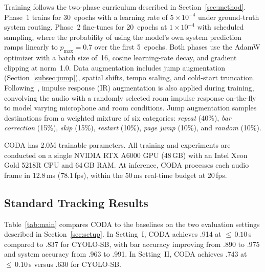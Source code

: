 \documentclass{article}
\begin{document}
Training follows the two-phase curriculum described in
Section~\ref{sec:method}. Phase~1 trains for 30~epochs with a learning rate of
$5{\times}10^{-4}$ under ground-truth system routing. Phase~2 fine-tunes for
20~epochs at $1{\times}10^{-4}$ with scheduled sampling, where the probability of using the model's own system prediction ramps linearly to $p_{\max}{=}0.7$ over the first 5~epochs. Both phases use the AdamW optimizer with a batch size of~16, cosine learning-rate decay, and gradient clipping at
norm~1.0. Data augmentation includes jump augmentation (Section~\ref{subsec:jump}), spatial shifts, tempo scaling, and cold-start truncation. Following~\cite{henkel2021real}, impulse response (IR) augmentation is also applied during training, convolving the audio with a randomly selected room impulse response on-the-fly to model varying microphone and room conditions. Jump augmentation samples destinations from a weighted mixture of six categories: \emph{repeat} (40\%), \emph{bar correction} (15\%), \emph{skip} (15\%), \emph{restart} (10\%), \emph{page jump} (10\%), and \emph{random} (10\%).
 
CODA has 2.0M trainable parameters. All training and experiments are conducted on a single NVIDIA RTX A6000 GPU (48\,GB) with an Intel Xeon Gold 5218R CPU and 64\,GB RAM. At inference, CODA processes each audio frame in 12.8\,ms (78.1\,fps), within the 50\,ms real-time budget at 20\,fps.

\subsection{Standard Tracking Results}\label{sec:tracking}
 
Table~\ref{tab:main} compares CODA to the baselines on the two evaluation
settings described in Section~\ref{sec:setup}. In Setting~I, CODA achieves .914 at ${\leq}\,0.10$\,s compared to .837 for CYOLO-SB, with bar accuracy improving from .890 to .975 and system accuracy from .963 to .991. In Setting~II, CODA achieves .743 at ${\leq}\,0.10$\,s versus .630 for CYOLO-SB.
\end{document}
